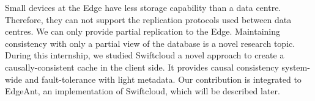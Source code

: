 \documentclass[11pt]{article}
\begin{document}
Small devices at the Edge have less storage capability than a data centre.
Therefore, they can not support the replication protocols used between data
centres. We can only provide partial replication to the Edge. Maintaining
consistency with only a partial view of the database is a novel research
topic. During this internship, we studied Swiftcloud \cite{Zawirski2015} a
novel approach to create a causally-consistent cache in the client side. It
provides causal consistency system-wide and fault-tolerance with light
metadata. Our contribution is integrated to EdgeAnt, an implementation of
Swiftcloud, which will be described later.


\end{document}
